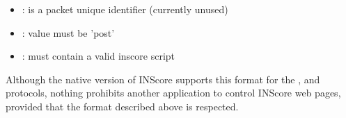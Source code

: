 \documentclass[a4paper,twoside]{article}
\begin{document}
\begin{itemize}
\item {}: is a packet unique identifier (currently unused)
\item {}: value must be 'post'
\item {}: must contain a valid inscore script
\end{itemize}

Although the native version of INScore supports this format for the ,  and  protocols, nothing prohibits another application to control INScore web pages, provided that the format described above is respected.
\end{document}
